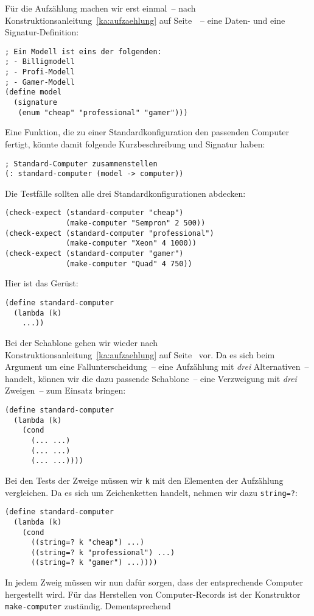 Für die Aufzählung machen wir erst einmal~-- nach
Konstruktionsanleitung~\ref{ka:aufzaehlung} auf
Seite~\pageref{ka:aufzaehlung}~-- eine Daten- und eine
Signatur-Definition:
%
\begin{lstlisting}
; Ein Modell ist eins der folgenden:
; - Billigmodell
; - Profi-Modell
; - Gamer-Modell
(define model
  (signature
   (enum "cheap" "professional" "gamer")))
\end{lstlisting}
%
Eine Funktion, die zu einer Standardkonfiguration den passenden
Computer fertigt, könnte damit folgende Kurzbeschreibung und Signatur haben:
%
\begin{lstlisting}
; Standard-Computer zusammenstellen
(: standard-computer (model -> computer))
\end{lstlisting}
%
Die Testfälle sollten alle drei Standardkonfigurationen abdecken:
%
\begin{lstlisting}
(check-expect (standard-computer "cheap")
              (make-computer "Sempron" 2 500))
(check-expect (standard-computer "professional")
              (make-computer "Xeon" 4 1000))
(check-expect (standard-computer "gamer")
              (make-computer "Quad" 4 750))
\end{lstlisting}
%
Hier ist das Gerüst:
%
\begin{lstlisting}
(define standard-computer
  (lambda (k)
    ...))
\end{lstlisting}
%
Bei der Schablone gehen wir wieder nach Konstruktionsanleitung~\ref{ka:aufzaehlung} auf
Seite~\pageref{ka:aufzaehlung} vor.
Da es sich beim Argument um eine Fallunterscheidung~-- eine Aufzählung
mit \emph{drei} Alternativen~-- handelt, können wir die
dazu passende Schablone~-- eine Verzweigung mit \emph{drei} Zweigen~--
zum Einsatz bringen:
%
\begin{lstlisting}
(define standard-computer
  (lambda (k)
    (cond
      (... ...)
      (... ...)
      (... ...))))
\end{lstlisting}
%
Bei den Tests der Zweige müssen wir \lstinline{k} mit den Elementen der
Aufzählung vergleichen.  Da es sich um Zeichenketten handelt, nehmen
wir dazu \lstinline{string=?}:
%
\begin{lstlisting}
(define standard-computer
  (lambda (k)
    (cond
      ((string=? k "cheap") ...)
      ((string=? k "professional") ...)
      ((string=? k "gamer") ...))))
\end{lstlisting}
%
In jedem Zweig müssen wir nun dafür sorgen, dass der entsprechende
Computer hergestellt wird.  Für das Herstellen von Computer-Records
ist der Konstruktor \lstinline{make-computer} zuständig.  Dementsprechend
